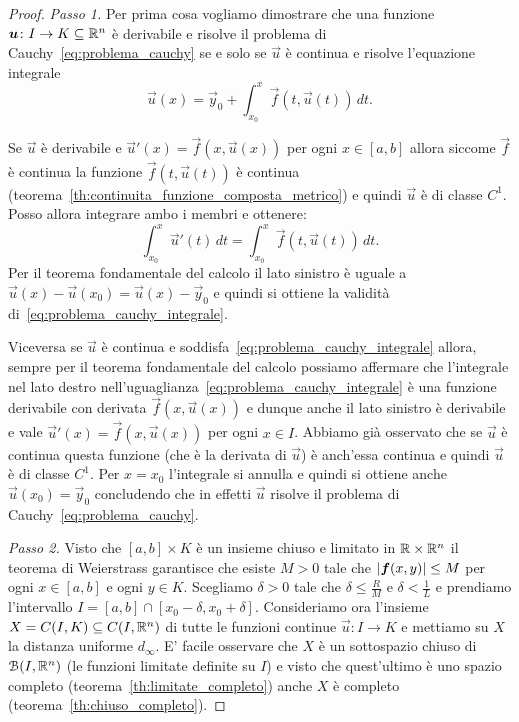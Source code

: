 \begin{proof}
  \emph{Passo 1.}
  Per prima cosa vogliamo dimostrare che una funzione $\boldsymbol u\colon I\to K\subseteq {\mathbb R}^n$
  è derivabile e risolve il problema di Cauchy~\eqref{eq:problema_cauchy} 
  se e solo se 
  $\vec u$ è continua e risolve l'equazione integrale
  \begin{equation}\label{eq:problema_cauchy_integrale}
  \vec u(x) = \vec y_0 + \int_{x_0}^x \vec f(t,\vec u(t))\, dt.
  \end{equation}

  Se $\vec u$ è derivabile e 
  $\vec u'(x) = \vec f(x, \vec u(x))$ per ogni $x\in[a,b]$ allora 
  siccome $\vec f$ è continua la funzione $\vec f(t,\vec u(t))$ è continua 
  (teorema~\ref{th:continuita_funzione_composta_metrico})
  e quindi $\vec u$ è di classe $C^1$. 
  Posso allora integrare ambo i membri 
  e ottenere:
  \[
   \int_{x_0}^x \vec u'(t)\, dt = \int_{x_0}^x \vec f(t,\vec u(t))\, dt.  
  \]
  Per il teorema fondamentale del calcolo il lato sinistro è uguale 
  a $\vec u(x) - \vec u(x_0) = \vec u(x) - \vec y_0$ e quindi si ottiene 
  la validità di~\eqref{eq:problema_cauchy_integrale}.

  Viceversa se $\vec u$ è continua e soddisfa~\eqref{eq:problema_cauchy_integrale}
  allora, sempre per il teorema fondamentale del calcolo possiamo affermare
  che l'integrale nel lato destro nell'uguaglianza~\eqref{eq:problema_cauchy_integrale}
  è una funzione derivabile con derivata $\vec f(x,\vec u(x))$ e dunque anche 
  il lato sinistro è derivabile e vale $\vec u'(x) = \vec f(x,\vec u(x))$ per 
  ogni $x\in I$. 
  Abbiamo già osservato che se $\vec u$ è continua questa funzione (che è la derivata 
  di $\vec u$) è anch'essa continua e quindi $\vec u$ è di classe $C^1$.
  Per $x=x_0$ l'integrale si annulla e quindi si ottiene 
  anche $\vec u(x_0) = \vec y_0$ concludendo che in effetti $\vec u$ risolve 
  il problema di Cauchy~\eqref{eq:problema_cauchy}.

  \emph{Passo 2.}
  Visto che $[a,b]\times K$ è un insieme chiuso e limitato in ${\mathbb R} \times {\mathbb R}^n$ 
  il teorema di Weierstrass garantisce che esiste $M>0$ tale che 
  ${\left|\boldsymbol f(x,y)\right|}\le M$ per ogni $x\in [a,b]$ e ogni $y\in K$.
  Scegliamo $\delta >0$ tale che $\delta \le \frac{R}{M}$ e $\delta < \frac {1}{L}$
  e prendiamo l'intervallo $I = [a,b]\cap [x_0-\delta,x_0+\delta]$.
  Consideriamo ora l'insieme $X=C(I,K)\subseteq C(I,{\mathbb R}^n)$ di tutte le funzioni continue $\vec u\colon I\to K$
  e mettiamo su $X$ la distanza uniforme $d_\infty$.
  E' facile osservare che $X$ è un sottospazio chiuso di $\mathcal B(I,{\mathbb R}^n)$ (le funzioni limitate definite su $I$)
  e visto che quest'ultimo è uno spazio completo (teorema~\ref{th:limitate_completo}) anche $X$ 
  è completo (teorema~\ref{th:chiuso_completo}).


\end{proof}
